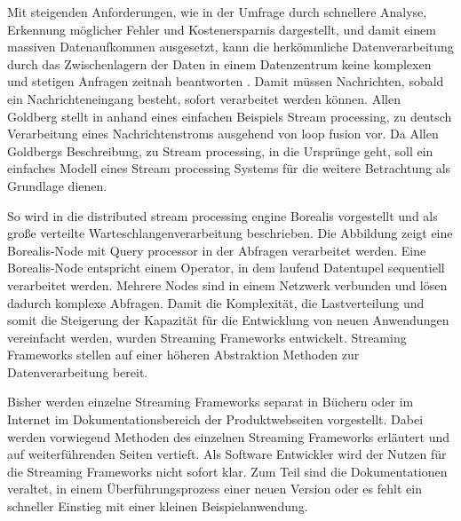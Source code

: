 Mit steigenden Anforderungen, wie in der Umfrage  durch schnellere Analyse, Erkennung möglicher Fehler und Kostenersparnis dargestellt, und damit einem massiven Datenaufkommen ausgesetzt, kann die herkömmliche Datenverarbeitung  durch das Zwischenlagern der Daten in einem Datenzentrum keine komplexen und stetigen Anfragen zeitnah beantworten . Damit müssen Nachrichten, sobald ein Nachrichteneingang besteht, sofort verarbeitet werden können. Allen Goldberg stellt in  anhand eines einfachen Beispiels Stream processing, zu deutsch Verarbeitung eines Nachrichtenstroms ausgehend von loop fusion  vor. Da Allen Goldbergs Beschreibung, zu Stream processing, in die Ursprünge geht, soll ein einfaches Modell eines Stream processing Systems für die weitere Betrachtung als Grundlage dienen.

So wird in  die distributed stream processing engine Borealis vorgestellt und als große verteilte Warteschlangenverarbeitung beschrieben. Die Abbildung  zeigt eine Borealis-Node mit Query processor in der Abfragen verarbeitet werden. Eine Borealis-Node entspricht einem Operator, in dem laufend Datentupel sequentiell verarbeitet werden. Mehrere Nodes sind in einem Netzwerk verbunden und lösen dadurch komplexe Abfragen. Damit die Komplexität, die Lastverteilung und somit die Steigerung der Kapazität für die Entwicklung von neuen Anwendungen vereinfacht werden, wurden Streaming Frameworks entwickelt. Streaming Frameworks stellen auf einer höheren Abstraktion Methoden zur Datenverarbeitung bereit. 

Bisher werden einzelne Streaming Frameworks separat in Büchern oder im Internet im Dokumentationsbereich der Produktwebseiten vorgestellt. Dabei werden vorwiegend Methoden des einzelnen Streaming Frameworks erläutert und auf weiterführenden Seiten vertieft. Als Software Entwickler wird der Nutzen für die Streaming Frameworks nicht sofort klar. Zum Teil sind die Dokumentationen veraltet, in einem Überführungsprozess einer neuen Version oder es fehlt ein schneller Einstieg mit einer kleinen Beispielanwendung.

